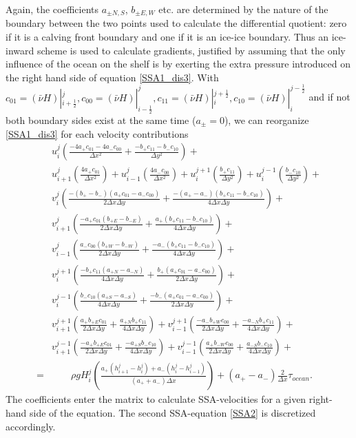 \documentclass[a4paper,10pt]{article}
\begin{document}
Again, the coefficients $a_{\pm N,S}$, $b_{\pm E,W}$ etc. are determined by the nature of the boundary between the two points used to calculate the differential quotient: zero if it is a calving front boundary and one if it is an ice-ice boundary. Thus an ice-inward scheme is used to calculate gradients, justified by assuming that the only influence of the ocean on the shelf is by exerting the extra pressure introduced on the right hand side of equation \eqref{SSA1_dis3}.\newline
\newline
With $c_{01}=(\bar{\nu}H)|_{i+\frac{1}{2}}^j, c_{00}=(\bar{\nu}H)|_{i-\frac{1}{2}}^j, c_{11}=(\bar{\nu}H)|_{i}^{j+\frac{1}{2}}, c_{10}=(\bar{\nu}H)|_{i}^{j-\frac{1}{2}}$ and if not both boundary sides exist at the same time ($a_{\pm}=0$), we can reorganize \eqref{SSA1_dis3} for each velocity contributions
\begin{align}
& u_{i}^{j}\left(\frac{-4a_+c_{01}-4a_-c_{00}}{\Delta x^2}+\frac{-b_+c_{11}-b_-c_{10}}{\Delta y^2}\right)+ \nonumber \\
& u_{i+1}^{j}\left(\frac{4a_+c_{01}}{\Delta x^2}\right)+u_{i-1}^{j}\left(\frac{4a_-c_{00}}{\Delta x^2}\right)+u_{i}^{j+1}\left(\frac{b_+c_{11}}{\Delta y^2}\right)+u_{i}^{j-1}\left(\frac{b_-c_{10}}{\Delta y^2}\right)+ \nonumber \\
& v_{i}^{j}\left(\frac{-(b_+-b_-)(a_+ c_{01}-a_- c_{00})}{2 \Delta x \Delta y}+\frac{-(a_+-a_-)(b_+ c_{11}-b_- c_{10})}{4 \Delta x \Delta y}\right)+ \nonumber \\
& v_{i+1}^{j}\left(\frac{-a_+ c_{01} (b_{+E}-b_{-E})}{2 \Delta x \Delta y}+\frac{a_+ (b_{+}c_{11}-b_{-}c_{10})}{4 \Delta x \Delta y}\right)+ \nonumber \\
& v_{i-1}^{j}\left(\frac{a_- c_{00} (b_{+W}-b_{-W})}{2 \Delta x \Delta y}+\frac{-a_-(b_{+}c_{11}-b_{-}c_{10})}{4 \Delta x \Delta y}\right)+ \nonumber \\
& v_{i}^{j+1}\left(\frac{-b_+ c_{11} (a_{+N}-a_{-N})}{4 \Delta x \Delta y}+\frac{b_+(a_{+}c_{01}-a_{-}c_{00})}{2 \Delta x \Delta y}\right)+ \nonumber \\
& v_{i}^{j-1}\left(\frac{b_- c_{10} (a_{+S}-a_{-S})}{4 \Delta x \Delta y}+\frac{-b_-(a_{+}c_{01}-a_{-}c_{00})}{2 \Delta x \Delta y}\right)+ \nonumber \\
& v_{i+1}^{j+1}\left(\frac{a_+ b_{+E} c_{01}}{2 \Delta x \Delta y}+\frac{a_{+N} b_{+} c_{11}}{4 \Delta x \Delta y}\right)+ v_{i-1}^{j+1}\left(\frac{-a_- b_{+W} c_{00}}{2 \Delta x \Delta y}+\frac{-a_{-N} b_{+} c_{11}}{4 \Delta x \Delta y}\right)+ \nonumber \\
& v_{i+1}^{j-1}\left(\frac{-a_+ b_{+E} c_{01}}{2 \Delta x \Delta y}+\frac{-a_{+S} b_{-} c_{10}}{4 \Delta x \Delta y}\right)+ v_{i-1}^{j-1}\left(\frac{a_+ b_{-W} c_{00}}{2 \Delta x \Delta y}+\frac{a_{-S} b_{-} c_{10}}{4 \Delta x \Delta y}\right)+ \nonumber \\
= &\qquad \rho gH_{i}^{j} \left(\frac{a_+(h_{i+1}^{j}-h_{i}^{j})+a_-(h_{i}^{j}-h_{i-1}^{j})}{(a_++a_-)\Delta x}\right) + (a_+ - a_-)\frac{2}{\Delta x}\tau_{ocean}. \label{SSA1_dis4}
\end{align}
The coefficients enter the matrix to calculate SSA-velocities for a given right-hand side of the equation. The second SSA-equation \eqref{SSA2} is discretized accordingly.
\end{document}
